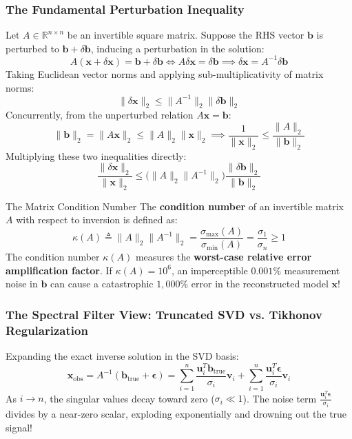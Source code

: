\subsubsection{The Fundamental Perturbation Inequality}
Let $A \in \mathbb{R}^{n \times n}$ be an invertible square matrix. Suppose the RHS vector $\mathbf{b}$ is perturbed to $\mathbf{b} + \delta \mathbf{b}$, inducing a perturbation in the solution:
\begin{equation}
A(\mathbf{x} + \delta \mathbf{x}) = \mathbf{b} + \delta \mathbf{b} \iff A \delta \mathbf{x} = \delta \mathbf{b} \implies \delta \mathbf{x} = A^{-1} \delta \mathbf{b}
\end{equation}
Taking Euclidean vector norms and applying sub-multiplicativity of matrix norms:
\begin{equation}
\|\delta \mathbf{x}\|_2 \le \|A^{-1}\|_2 \|\delta \mathbf{b}\|_2
\end{equation}
Concurrently, from the unperturbed relation $A\mathbf{x} = \mathbf{b}$:
\begin{equation}
\|\mathbf{b}\|_2 = \|A\mathbf{x}\|_2 \le \|A\|_2 \|\mathbf{x}\|_2 \implies \frac{1}{\|\mathbf{x}\|_2} \le \frac{\|A\|_2}{\|\mathbf{b}\|_2}
\end{equation}
Multiplying these two inequalities directly:
\begin{equation}
\frac{\|\delta \mathbf{x}\|_2}{\|\mathbf{x}\|_2} \le \Big( \|A\|_2 \|A^{-1}\|_2 \Big) \frac{\|\delta \mathbf{b}\|_2}{\|\mathbf{b}\|_2}
\label{eq:relative_error_bound}
\end{equation}

\begin{definitionbox}{The Matrix Condition Number}
The \textbf{condition number} of an invertible matrix $A$ with respect to inversion is defined as:
\begin{equation}
\kappa(A) \triangleq \|A\|_2 \|A^{-1}\|_2 = \frac{\sigma_{\max}(A)}{\sigma_{\min}(A)} = \frac{\sigma_1}{\sigma_n} \ge 1
\label{eq:condition_number_svd}
\end{equation}
The condition number $\kappa(A)$ measures the \textbf{worst-case relative error amplification factor}. If $\kappa(A) = 10^6$, an imperceptible $0.001\%$ measurement noise in $\mathbf{b}$ can cause a catastrophic $1{,}000\%$ error in the reconstructed model $\mathbf{x}$!
\end{definitionbox}

\subsubsection{The Spectral Filter View: Truncated SVD vs. Tikhonov Regularization}
Expanding the exact inverse solution in the SVD basis:
\begin{equation}
\mathbf{x}_{\text{obs}} = A^{-1}(\mathbf{b}_{\text{true}} + \boldsymbol{\epsilon}) = \sum_{i=1}^n \frac{\mathbf{u}_i^T \mathbf{b}_{\text{true}}}{\sigma_i} \mathbf{v}_i + \sum_{i=1}^n \frac{\mathbf{u}_i^T \boldsymbol{\epsilon}}{\sigma_i} \mathbf{v}_i
\end{equation}
As $i \to n$, the singular values decay toward zero ($\sigma_i \ll 1$). The noise term $\frac{\mathbf{u}_i^T \boldsymbol{\epsilon}}{\sigma_i}$ divides by a near-zero scalar, exploding exponentially and drowning out the true signal!

